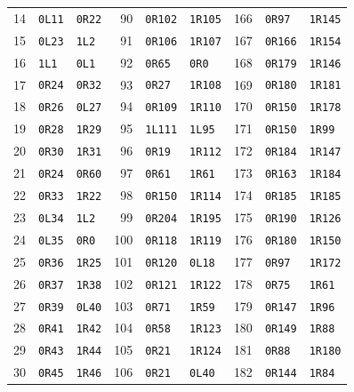 {\begin{longtable}{@{}rll@{\hspace{8mm}}rll@{\hspace{8mm}}rll@{}}
14 & \texttt{0L11} & \texttt{0R22} & 90 & \texttt{0R102} & \texttt{1R105} & 166 & \texttt{0R97} & \texttt{1R145} \\
15 & \texttt{0L23} & \texttt{1L2} & 91 & \texttt{0R106} & \texttt{1R107} & 167 & \texttt{0R166} & \texttt{1R154} \\
16 & \texttt{1L1} & \texttt{0L1} & 92 & \texttt{0R65} & \texttt{0R0} & 168 & \texttt{0R179} & \texttt{1R146} \\
17 & \texttt{0R24} & \texttt{0R32} & 93 & \texttt{0R27} & \texttt{1R108} & 169 & \texttt{0R180} & \texttt{1R181} \\
18 & \texttt{0R26} & \texttt{0L27} & 94 & \texttt{0R109} & \texttt{1R110} & 170 & \texttt{0R150} & \texttt{1R178} \\
19 & \texttt{0R28} & \texttt{1R29} & 95 & \texttt{1L111} & \texttt{1L95} & 171 & \texttt{0R150} & \texttt{1R99} \\
20 & \texttt{0R30} & \texttt{1R31} & 96 & \texttt{0R19} & \texttt{1R112} & 172 & \texttt{0R184} & \texttt{1R147} \\
21 & \texttt{0R24} & \texttt{0R60} & 97 & \texttt{0R61} & \texttt{1R61} & 173 & \texttt{0R163} & \texttt{1R184} \\
22 & \texttt{0R33} & \texttt{1R22} & 98 & \texttt{0R150} & \texttt{1R114} & 174 & \texttt{0R185} & \texttt{1R185} \\
23 & \texttt{0L34} & \texttt{1L2} & 99 & \texttt{0R204} & \texttt{1R195} & 175 & \texttt{0R190} & \texttt{1R126} \\
24 & \texttt{0L35} & \texttt{0R0} & 100 & \texttt{0R118} & \texttt{1R119} & 176 & \texttt{0R180} & \texttt{1R150} \\
25 & \texttt{0R36} & \texttt{1R25} & 101 & \texttt{0R120} & \texttt{0L18} & 177 & \texttt{0R97} & \texttt{1R172} \\
26 & \texttt{0R37} & \texttt{1R38} & 102 & \texttt{0R121} & \texttt{1R122} & 178 & \texttt{0R75} & \texttt{1R61} \\
27 & \texttt{0R39} & \texttt{0L40} & 103 & \texttt{0R71} & \texttt{1R59} & 179 & \texttt{0R147} & \texttt{1R96} \\
28 & \texttt{0R41} & \texttt{1R42} & 104 & \texttt{0R58} & \texttt{1R123} & 180 & \texttt{0R149} & \texttt{1R88} \\
29 & \texttt{0R43} & \texttt{1R44} & 105 & \texttt{0R21} & \texttt{1R124} & 181 & \texttt{0R88} & \texttt{1R180} \\
30 & \texttt{0R45} & \texttt{1R46} & 106 & \texttt{0R21} & \texttt{0L40} & 182 & \texttt{0R144} & \texttt{1R84} \\

\end{longtable}}

